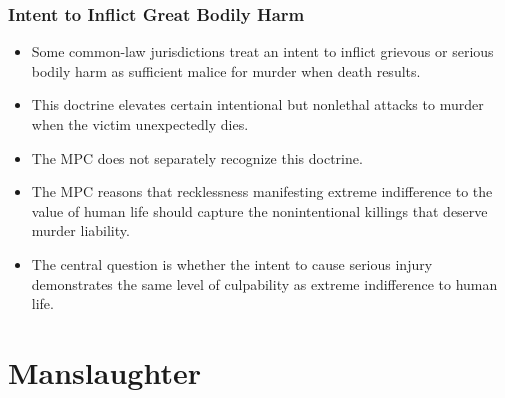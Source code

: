 \documentclass[11pt]{tex/lawoutline}
\begin{document}
\subsubsection{Intent to Inflict Great Bodily Harm}
{
\begin{itemize}
    \item Some common-law jurisdictions treat an intent to inflict grievous or serious bodily harm as sufficient malice for murder when death results.
    \item This doctrine elevates certain intentional but nonlethal attacks to murder when the victim unexpectedly dies.
    \item The MPC does not separately recognize this doctrine.
    \item The MPC reasons that recklessness manifesting extreme indifference to the value of human life should capture the nonintentional killings that deserve murder liability.
    \item The central question is whether the intent to cause serious injury demonstrates the same level of culpability as extreme indifference to human life.
\end{itemize}
}

\section{Manslaughter}
\end{document}
